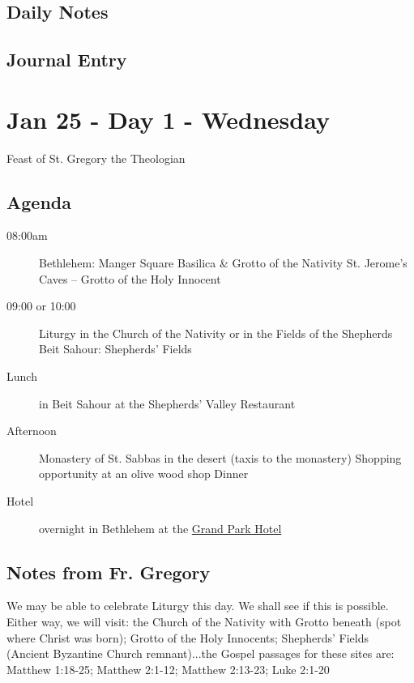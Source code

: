 \documentclass[letterpaper]{report}
\begin{document}
\clearpage
\subsection{Daily Notes}
\clearpage
\subsection{Journal Entry}

\clearpage
\section{Jan 25 - Day 1 - Wednesday}
Feast of St. Gregory the Theologian

\subsection{Agenda}
\begin{description}
	\item[08:00am] Bethlehem: Manger Square
	    \subitem Basilica \& Grotto of the Nativity
	    \subitem St. Jerome's Caves – Grotto of the Holy Innocent
	\item[09:00 or 10:00] Liturgy in the Church of the Nativity or in the 
		Fields of the Shepherds
		\subitem Beit Sahour: Shepherds’ Fields
	\item[Lunch] in Beit Sahour at the Shepherds’ Valley Restaurant 
	\item[Afternoon] Monastery of St. Sabbas in the desert 
	    (taxis to the monastery)
	    \subitem Shopping opportunity at an olive wood shop Dinner 
	    
	\item[Hotel] overnight in Bethlehem at the
	  \href{http://www.grandpark.com/bethlehem/}{Grand Park Hotel}
\end{description}

\subsection{Notes from Fr. Gregory}
We may be able to celebrate Liturgy this day. We shall see if this is possible. Either way, we will visit: the Church of the Nativity with Grotto beneath (spot where Christ was born); Grotto of the Holy Innocents; Shepherds' Fields (Ancient Byzantine Church remnant)...the Gospel passages for these sites are: 
Matthew 1:18-25; Matthew 2:1-12; Matthew 2:13-23; Luke 2:1-20
\end{document}
